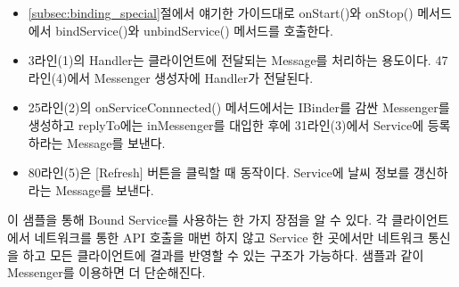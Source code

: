 \begin{itemize}
\item \ref{subsec:binding_special}절에서 얘기한 가이드대로 onStart()와 onStop() 메서드에서 bindService()와 unbindService() 메서드를 호출한다.

\item 3라인(1)의 Handler는 클라이언트에 전달되는 Message를 처리하는 용도이다. 47라인(4)에서 Messenger 생성자에 Handler가 전달된다.

\item 25라인(2)의 onServiceConnnected() 메서드에서는 IBinder를 감싼 Messenger를 생성하고 replyTo에는 inMessenger를 대입한 후에  31라인(3)에서 Service에 등록하라는 Message를  보낸다.

\item 80라인(5)은 [Refresh] 버튼을 클릭할 때 동작이다. Service에 날씨 정보를 갱신하라는 Message를 보낸다.
\end{itemize}

이 샘플을 통해 Bound Service를 사용하는 한 가지 장점을 알 수 있다. 각 클라이언트에서 네트워크를 통한 API 호출을 매번 하지 않고 Service 한 곳에서만 네트워크 통신을 하고 모든 클라이언트에 결과를 반영할 수 있는 구조가 가능하다. 샘플과 같이 Messenger를 이용하면 더 단순해진다.
